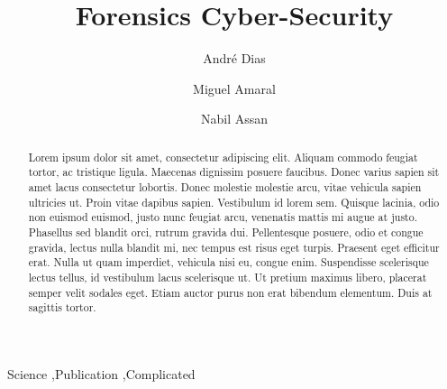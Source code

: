\documentclass[preprint,12pt]{elsarticle}
\begin{document}
\begin{frontmatter}


\title{Forensics Cyber-Security}




\author{André Dias}
\author{Miguel Amaral}
\author{Nabil Assan}

\address{Instituto Superior Técnico}

\begin{abstract}
Lorem ipsum dolor sit amet, consectetur adipiscing elit. Aliquam commodo feugiat tortor, ac tristique ligula. Maecenas dignissim posuere faucibus. Donec varius sapien sit amet lacus consectetur lobortis. Donec molestie molestie arcu, vitae vehicula sapien ultricies ut. Proin vitae dapibus sapien. Vestibulum id lorem sem. Quisque lacinia, odio non euismod euismod, justo nunc feugiat arcu, venenatis mattis mi augue at justo. Phasellus sed blandit orci, rutrum gravida dui. Pellentesque posuere, odio et congue gravida, lectus nulla blandit mi, nec tempus est risus eget turpis. Praesent eget efficitur erat. Nulla ut quam imperdiet, vehicula nisi eu, congue enim. Suspendisse scelerisque lectus tellus, id vestibulum lacus scelerisque ut. Ut pretium maximus libero, placerat semper velit sodales eget. Etiam auctor purus non erat bibendum elementum. Duis at sagittis tortor.
\end{abstract}

\begin{keyword}
Science \sep Publication \sep Complicated


\end{keyword}

\end{frontmatter}
\end{document}
